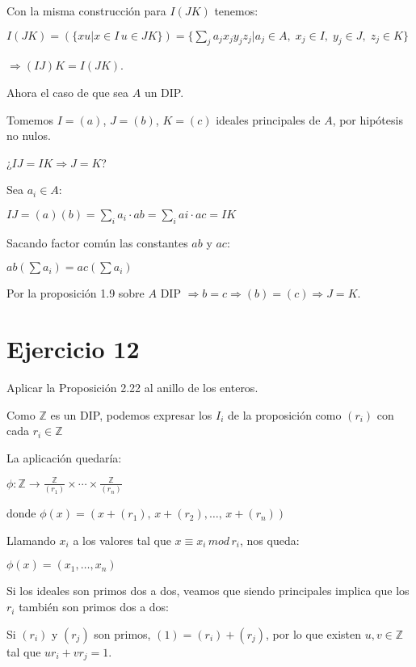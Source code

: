 \documentclass[10pt,a4paper]{article}
\begin{document}
	Con la misma construcción para $I(JK)$ tenemos:
	
	$I(JK) =  \left( \{ xu \vert x\in I \, u \in JK \} \right) =  \{ \sum_j a_j x_j y_j z_j \vert a_j \in A, \; x_j \in I, \; y_j \in J, \; z_j \in K \} $ 
	
	$\Rightarrow (IJ)K = I(JK)$.
	
	\hfil
	
	Ahora el caso de que sea $A$ un DIP.
	
	Tomemos $I=(a)$, $J=(b)$, $K=(c)$ ideales principales de $A$, por hipótesis no nulos.
	
	¿$IJ=IK \Rightarrow J=K$?
	
	Sea $a_i \in A$:
	
	$IJ = (a)(b) = \sum_i a_i \cdot ab = \sum_i ai \cdot ac = IK$
	
	Sacando factor común las constantes $ab$ y $ac$:
	
	$ab(\sum a_i) = ac (\sum a_i)$
	
	Por la proposición 1.9 sobre $A$ DIP $\Rightarrow  b = c \Rightarrow (b) = (c) \Rightarrow J = K$.
	
	
	
	
	
	\section*{Ejercicio 12}
	
	Aplicar la Proposición 2.22 al anillo de los enteros.
	
	\hfill
	
	
	Como $\mathbb{Z}$ es un DIP, podemos expresar los $I_i$ de la proposición como $(r_i)$ con cada $r_i \in \mathbb{Z}$
	
	La aplicación quedaría:
	
	$ \phi \colon \mathbb{Z} \rightarrow \frac{\mathbb{Z}}{(r_1)} \times \cdots \times \frac{\mathbb{Z}}{(r_n)} $
	
	
	donde $ \phi \left( x  \right) = ( x+(r_1) ,\, x+(r_2), \ldots,\, x+(r_n) )  $
	
	
	Llamando $ x_i $ a los valores tal que $ x \equiv x_i\, mod\, r_i$, nos queda:
	
	$ \phi \left( x  \right) = ( x_1, \ldots, x_n )  $
	
	\hfil 
	
	Si los ideales son primos dos a dos, veamos que siendo principales implica que los $r_i$ también son primos dos a dos:
	
	Si $(r_i)$ y $(r_j)$ son primos, $(1) = (r_i) + (r_j)$, por lo que existen $u, v \in \mathbb{Z} $ tal que $ ur_i + vr_j = 1$.
	
\end{document}
